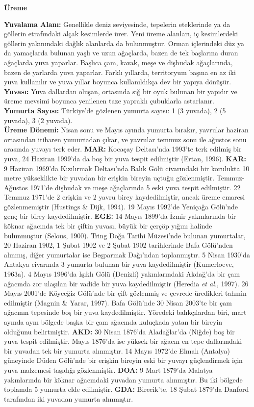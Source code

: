 \documentclass[
  a4paper,
  DIV=11,
  numbers=noendperiod]{scrreprt}
\begin{document}
\textbf{Üreme}

\textbf{Yuvalama Alanı:} Genellikle deniz seviyesinde, tepelerin
eteklerinde ya da göllerin etrafındaki alçak kesimlerde ürer. Yeni üreme
alanları, iç kesimlerdeki göllerin yakınındaki dağlık alanlarda da
bulunmuştur. Orman içlerindeki düz ya da yamaçlarda bulunan yaşlı ve
uzun ağaçlarda, bazen de tek başlarına duran ağaçlarda yuva yaparlar.
Başlıca çam, kavak, meşe ve dişbudak ağaçlarında, bazen de yarlarda yuva
yaparlar. Farklı yıllarda, territoryum başına en az iki yuva kullanılır
ve yuva yıllar boyunca kullanıldıkça dev bir yapıya dönüşür.\\
\textbf{Yuvası:} Yuva dallardan oluşan, ortasında sığ bir oyuk bulunan
bir yapıdır ve üreme mevsimi boyunca yenilenen taze yapraklı çubuklarla
astarlanır.\\
\textbf{Yumurta Sayısı:} Türkiye'de gözlenen yumurta sayısı: 1 (3
yuvada), 2 (5 yuvada), 3 (2 yuvada).\\
\textbf{Üreme Dönemi:} Nisan sonu ve Mayıs ayında yumurta bırakır,
yavrular haziran ortasından itibaren yumurtadan çıkar, ve yavrular
temmuz sonu ile ağustos sonu arasında yuvayı terk eder. \textbf{MAR:}
Kocaçay Deltası'nda 1993'te terk edilmiş bir yuva, 24 Haziran 1999'da da
boş bir yuva tespit edilmiştir (Ertan, 1996). \textbf{KAR:} 9 Haziran
1969'da Kızılırmak Deltası'nda Balık Gölü civarındaki bir korulukta 10
metre yükseklikte bir yuvadan bir erişkin bireyin uçtuğu gözlenmiştir.
Temmuz-Ağustos 1971'de dişbudak ve meşe ağaçlarında 5 eski yuva tespit
edilmiştir. 22 Temmuz 1971'de 2 erişkin ve 2 yavru birey kaydedilmiştir,
ancak üreme emaresi gözlenmemiştir (Hustings \& Dijk, 1994). 19 Mayıs
1992'de Yeniçağa Gölü'nde genç bir birey kaydedilmiştir. \textbf{EGE:}
14 Mayıs 1899'da İzmir yakınlarında bir köknar ağacında tek bir çiftin
yuvası, büyük bir çerçöp yığını halinde bulunmuştur (Selous, 1900).
Tring Doğa Tarihi Müzesi'nde bulunan yumurtalar, 20 Haziran 1902, 1
Şubat 1902 ve 2 Şubat 1902 tarihlerinde Bafa Gölü'nden alınmış, diğer
yumurtalar ise Beşparmak Dağı'ndan toplanmıştır. 5 Nisan 1930'da Antakya
civarında 3 yumurta bulunan bir yuva kaydedilmiştir (Kumerloeve, 1963a).
4 Mayıs 1996'da Işıklı Gölü (Denizli) yakınlarındaki Akdağ'da bir çam
ağacında zor ulaşılan bir vadide bir yuva kaydedilmiştir (Heredia
\emph{et al.}, 1997). 26 Mayıs 2001'de Köyceğiz Gölü'nde bir çift
gözlenmiş ve çevrede üredikleri tahmin edilmiştir (Magnin \& Yarar,
1997). Bafa Gölü'nde 30 Nisan 2003'te bir çam ağacının tepesinde boş bir
yuva kaydedilmiştir. Yöredeki balıkçılardan biri, mart ayında aynı
bölgede başka bir çam ağacında kuluçkada yatan bir bireyin olduğunu
belirtmiştir. \textbf{AKD:} 30 Nisan 1876'da Aladağlar'da (Niğde) boş
bir yuva tespit edilmiştir. Mayıs 1876'da ise yüksek bir ağacın en tepe
dallarındaki bir yuvadan tek bir yumurta alınmıştır. 14 Mayıs 1972'de
Elmalı (Antalya) güneyinde Düden Gölü'nde bir erişkin bireyin eski bir
yuvayı güçlendirmek için yuva malzemesi taşıdığı gözlenmiştir.
\textbf{DOA:} 9 Mart 1879'da Malatya yakınlarında bir köknar ağacındaki
yuvadan yumurta alınmıştır. Bu iki bölgede toplamda 5 yumurta elde
edilmiştir. \textbf{GDA:} Birecik'te, 18 Şubat 1879'da Danford
tarafından iki yuvadan yumurta alınmıştır.
\end{document}
